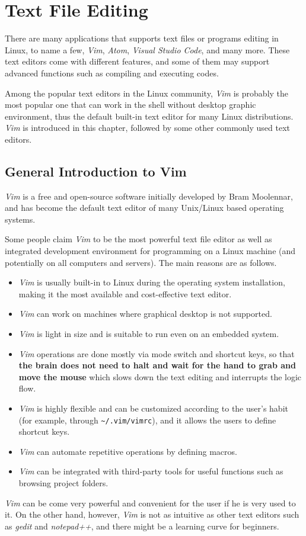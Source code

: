 \chapter{Text File Editing}

There are many applications that supports text files or programs editing in Linux, to name a few, \textit{Vim}, \textit{Atom}, \textit{Visual Studio Code}, and many more. These text editors come with different features, and some of them may support advanced functions such as compiling and executing codes.

Among the popular text editors in the Linux community, \textit{Vim} is probably the most popular one that can work in the shell without desktop graphic environment, thus the default built-in text editor for many Linux distributions. \textit{Vim} is introduced in this chapter, followed by some other commonly used text editors.

\section{General Introduction to Vim}

\textit{Vim} is a free and open-source software initially developed by Bram Moolennar, and has become the default text editor of many Unix/Linux based operating systems.

Some people claim \textit{Vim} to be the most powerful text file editor as well as integrated development environment for programming on a Linux machine (and potentially on all computers and servers). The main reasons are as follows.
\begin{itemize}
  \item \textit{Vim} is usually built-in to Linux during the operating system installation, making it the most available and cost-effective text editor.
  \item \textit{Vim} can work on machines where graphical desktop is not supported.
  \item \textit{Vim} is light in size and is suitable to run even on an embedded system.
  \item \textit{Vim} operations are done mostly via mode switch and shortcut keys, so that \textbf{the brain does not need to halt and wait for the hand to grab and move the mouse} which slows down the text editing and interrupts the logic flow.
  \item \textit{Vim} is highly flexible and can be customized according to the user's habit (for example, through \verb|~/.vim/vimrc|), and it allows the users to define shortcut keys.
  \item \textit{Vim} can automate repetitive operations by defining macros.
  \item \textit{Vim} can be integrated with third-party tools for useful functions such as browsing project folders.
\end{itemize}
\textit{Vim} can be come very powerful and convenient for the user if he is very used to it. On the other hand, however, \textit{Vim} is not as intuitive as other text editors such as \textit{gedit} and \textit{notepad++}, and there might be a learning curve for beginners.

